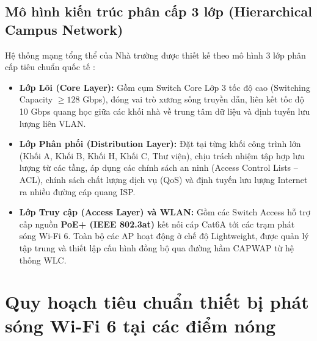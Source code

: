 \subsection{Mô hình kiến trúc phân cấp 3 lớp (Hierarchical Campus Network)}

Hệ thống mạng tổng thể của Nhà trường được thiết kế theo mô hình 3 lớp phân cấp tiêu chuẩn quốc tế \cite{cisco2021wlan}:
\begin{itemize}
    \item \textbf{Lớp Lõi (Core Layer):} Gồm cụm Switch Core Lớp 3 tốc độ cao (Switching Capacity $\ge 128$ Gbps), đóng vai trò xương sống truyền dẫn, liên kết tốc độ 10 Gbps quang học giữa các khối nhà về trung tâm dữ liệu và định tuyến lưu lượng liên VLAN.
    \item \textbf{Lớp Phân phối (Distribution Layer):} Đặt tại từng khối công trình lớn (Khối A, Khối B, Khối H, Khối C, Thư viện), chịu trách nhiệm tập hợp lưu lượng từ các tầng, áp dụng các chính sách an ninh (Access Control Lists -- ACL), chính sách chất lượng dịch vụ (QoS) và định tuyến lưu lượng Internet ra nhiều đường cáp quang ISP.
    \item \textbf{Lớp Truy cập (Access Layer) và WLAN:} Gồm các Switch Access hỗ trợ cấp nguồn \textbf{PoE+ (IEEE 802.3at)} kết nối cáp Cat6A tới các trạm phát sóng Wi-Fi 6. Toàn bộ các AP hoạt động ở chế độ Lightweight, được quản lý tập trung và thiết lập cấu hình đồng bộ qua đường hầm CAPWAP từ hệ thống WLC.
\end{itemize}

\section{Quy hoạch tiêu chuẩn thiết bị phát sóng Wi-Fi 6 tại các điểm nóng}

